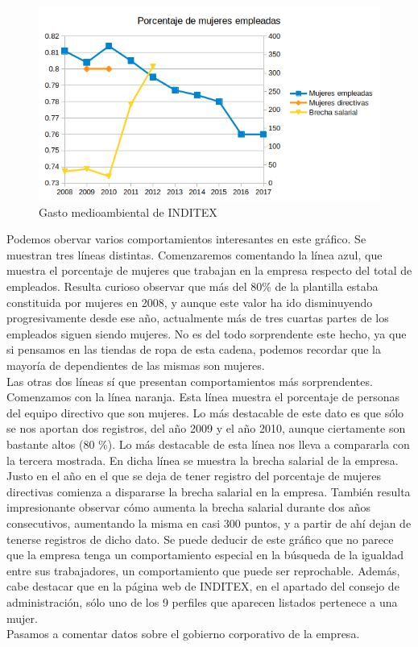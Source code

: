 \documentclass[11pt]{article}
\theoremstyle{plain}
\theoremstyle{definition}
\begin{document}
\begin{figure}[H]
  \centering \includegraphics[width=\textwidth]{graphs/social.png}
  \caption{Gasto medioambiental de INDITEX}
\end{figure}

Podemos obervar varios comportamientos interesantes en este gráfico.
Se muestran tres líneas distintas. Comenzaremos comentando la línea
azul, que muestra el porcentaje de mujeres que trabajan en la empresa
respecto del total de empleados. Resulta curioso observar que más del
80\% de la plantilla estaba constituida por mujeres en 2008, y aunque
este valor ha ido disminuyendo progresivamente desde ese año,
actualmente más de tres cuartas partes de los empleados siguen siendo
mujeres. No es del todo sorprendente este hecho, ya que si pensamos en
las tiendas de ropa de esta cadena, podemos recordar que
la mayoría de dependientes de las mismas son mujeres.\\

Las otras dos líneas sí que presentan comportamientos más
sorprendentes. Comenzamos con la línea naranja. Esta línea muestra el
porcentaje de personas del equipo directivo que son mujeres. Lo más
destacable de este dato es que sólo se nos aportan dos registros, del
año 2009 y el año 2010, aunque ciertamente son bastante altos (80 \%).
Lo más destacable de esta línea nos lleva a compararla con la tercera
mostrada. En dicha línea se muestra la brecha salarial de la empresa.
Justo en el año en el que se deja de tener registro del porcentaje de
mujeres directivas comienza a dispararse la brecha salarial en la
empresa. También resulta impresionante observar cómo aumenta la brecha
salarial durante dos años consecutivos, aumentando la misma en casi
300 puntos, y a partir de ahí dejan de tenerse registros de dicho
dato. Se puede deducir de este gráfico que no parece que la empresa
tenga un comportamiento especial en la búsqueda de la igualdad entre
sus trabajadores, un comportamiento que puede ser reprochable. Además,
cabe destacar que en la página web de INDITEX, en el apartado del
consejo de administración, sólo uno de los 9 perfiles que aparecen
listados pertenece a una mujer.\\

Pasamos a comentar datos sobre el gobierno corporativo de la empresa.

\printbibliography
\end{document}
